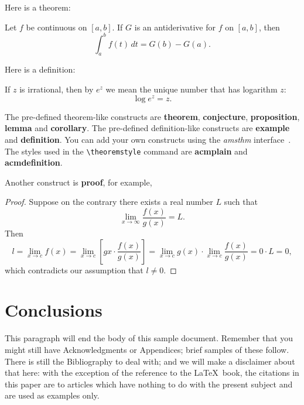 Here is a theorem:
\begin{theorem}
  Let $f$ be continuous on $[a,b]$.  If $G$ is
  an antiderivative for $f$ on $[a,b]$, then
  \begin{displaymath}
    \int^b_af(t)\,dt = G(b) - G(a).
  \end{displaymath}
\end{theorem}

Here is a definition:
\begin{definition}
  If $z$ is irrational, then by $e^z$ we mean the
  unique number that has
  logarithm $z$:
  \begin{displaymath}
    \log e^z = z.
  \end{displaymath}
\end{definition}

The pre-defined theorem-like constructs are \textbf{theorem},
\textbf{conjecture}, \textbf{proposition}, \textbf{lemma} and
\textbf{corollary}.  The pre-defined de\-fi\-ni\-ti\-on-like constructs are
\textbf{example} and \textbf{definition}.  You can add your own
constructs using the \textsl{amsthm} interface~\cite{Amsthm15}.  The
styles used in the \verb|\theoremstyle| command are \textbf{acmplain}
and \textbf{acmdefinition}.

Another construct is \textbf{proof}, for example,

\begin{proof}
  Suppose on the contrary there exists a real number $L$ such that
  \begin{displaymath}
    \lim_{x\rightarrow\infty} \frac{f(x)}{g(x)} = L.
  \end{displaymath}
  Then
  \begin{displaymath}
    l=\lim_{x\rightarrow c} f(x)
    = \lim_{x\rightarrow c}
    \left[ g{x} \cdot \frac{f(x)}{g(x)} \right ]
    = \lim_{x\rightarrow c} g(x) \cdot \lim_{x\rightarrow c}
    \frac{f(x)}{g(x)} = 0\cdot L = 0,
  \end{displaymath}
  which contradicts our assumption that $l\neq 0$.
\end{proof}

\section{Conclusions}
This paragraph will end the body of this sample document.
Remember that you might still have Acknowledgments or
Appendices; brief samples of these
follow.  There is still the Bibliography to deal with; and
we will make a disclaimer about that here: with the exception
of the reference to the \LaTeX\ book, the citations in
this paper are to articles which have nothing to
do with the present subject and are used as
examples only.



